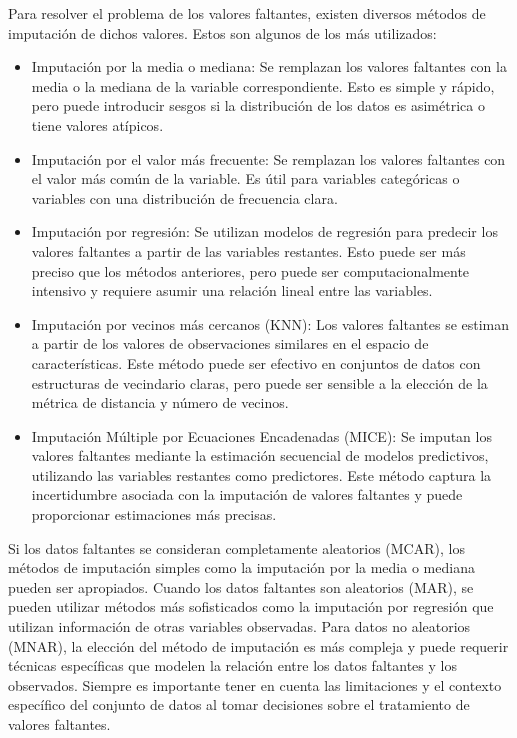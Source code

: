 Para resolver el problema de los valores faltantes, existen diversos métodos de imputación de dichos valores. Estos son algunos de los más utilizados:
\begin{itemize}
\item Imputación por la media o mediana: Se remplazan los valores faltantes con la media o la mediana de la variable correspondiente. Esto es simple y rápido, pero puede introducir sesgos si la distribución de los datos es asimétrica o tiene valores atípicos.
\item Imputación por el valor más frecuente: Se remplazan los valores faltantes con el valor más común de la variable. Es útil para variables categóricas o variables con una distribución de frecuencia clara.
\item Imputación por regresión: Se utilizan modelos de regresión para predecir los valores faltantes a partir de las variables restantes. Esto puede ser más preciso que los métodos anteriores, pero puede ser computacionalmente intensivo y requiere asumir una relación lineal entre las variables.
\item Imputación por vecinos más cercanos (KNN): Los valores faltantes se estiman a partir de los valores de observaciones similares en el espacio de características. Este método puede ser efectivo en conjuntos de datos con estructuras de vecindario claras, pero puede ser sensible a la elección de la métrica de distancia y número de vecinos.
\item Imputación Múltiple por Ecuaciones Encadenadas (MICE): Se imputan los valores faltantes mediante la estimación secuencial de modelos predictivos, utilizando las variables restantes como predictores. Este método captura la incertidumbre asociada con la imputación de valores faltantes y puede proporcionar estimaciones más precisas.
\end{itemize}

Si los datos faltantes se consideran completamente aleatorios (MCAR), los métodos de imputación simples como la imputación por la media o mediana pueden ser apropiados. Cuando los datos faltantes son aleatorios (MAR), se pueden utilizar métodos más sofisticados como la imputación por regresión que utilizan información de otras variables observadas. Para datos no aleatorios (MNAR), la elección del método de imputación es más compleja y puede requerir técnicas específicas que modelen la relación entre los datos faltantes y los observados. Siempre es importante tener en cuenta las limitaciones y el contexto específico del conjunto de datos al tomar decisiones sobre el tratamiento de valores faltantes.

